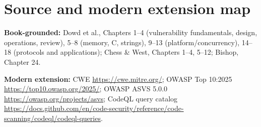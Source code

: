 \documentclass[
  letterpaper,
]{article}
\begin{document}
\section{Source and modern extension
map}\label{source-and-modern-extension-map}

\textbf{Book-grounded:} Dowd et al., Chapters 1--4 (vulnerability
fundamentals, design, operations, review), 5--8 (memory, C, strings),
9--13 (platform/concurrency), 14--18 (protocols and applications); Chess
\& West, Chapters 1--4, 5--12; Bishop, Chapter 24.

\textbf{Modern extension:} CWE \url{https://cwe.mitre.org/}; OWASP Top
10:2025 \url{https://top10.owasp.org/2025/}; OWASP ASVS 5.0.0
\url{https://owasp.org/projects/asvs}; CodeQL query catalog
\url{https://docs.github.com/en/code-security/reference/code-scanning/codeql/codeql-queries}.
\end{document}
